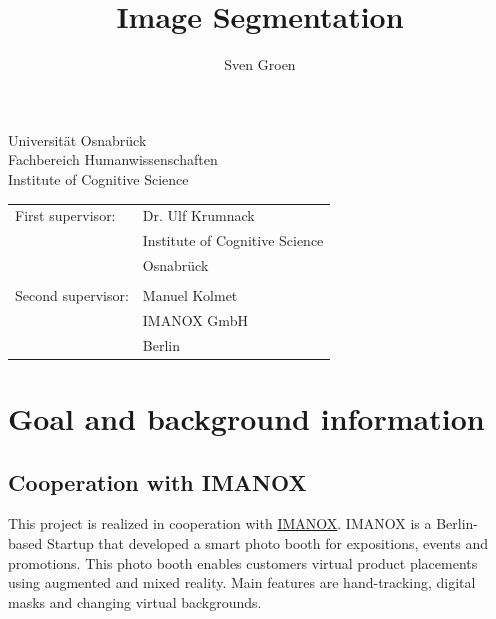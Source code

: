 \documentclass[11pt,
  paper=a4, 
  bibliography=totocnumbered,
	captions=tableheading,
	BCOR=10mm
]{scrreprt}
\title{Image Segmentation}
\author{Sven Groen}
\theoremstyle{definition}
\begin{document}
\begin{titlepage}
	\begin{flushleft}
		Universität Osnabrück\\
		Fachbereich Humanwissenschaften\\
		Institute of Cognitive Science
	\end{flushleft}

	\vspace{2cm}
	\vspace{1cm}

	\begin{tabular}{ll}
		First supervisor:  & Dr. Ulf Krumnack          \\
		                   & Institute of Cognitive Science            \\
		                   & Osnabrück                \\\\
		Second supervisor: & Manuel Kolmet         \\
		                   & IMANOX GmbH  \\
		                   & Berlin 
	\end{tabular}

\end{titlepage}


\pagebreak


\tableofcontents


\chapter{Goal and background information}

\section{Cooperation with IMANOX}
This project is realized in cooperation with \href{https://www.Imanox.de/}{IMANOX}. 
IMANOX is a Berlin-based Startup that developed a smart photo booth for expositions, events and promotions. 
This photo booth enables customers virtual product placements using augmented and mixed reality. 
Main features are hand-tracking, digital masks and changing virtual backgrounds.
\end{document}
